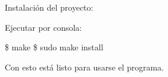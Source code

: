 Instalación del proyecto\-:

Ejecutar por consola\-:

\$ make \$ sudo make install

Con esto está listo para usarse el programa. 
